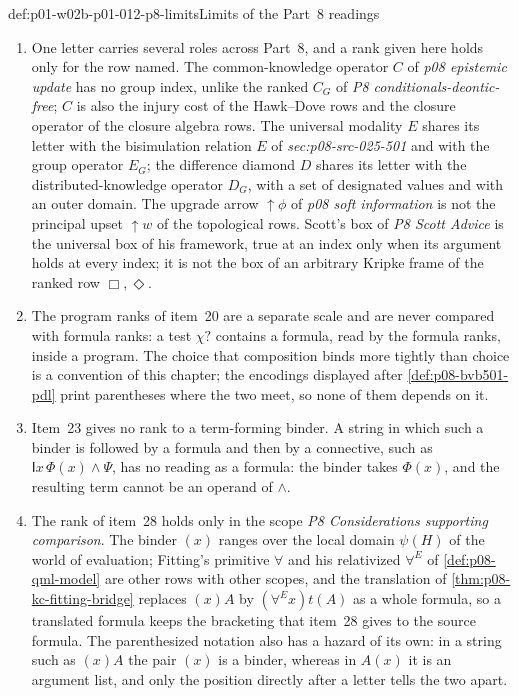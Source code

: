 \begin{hbwarning}{def:p01-w02b-p01-012-p8-limits}{Limits of the Part~8 readings}
\begin{enumerate}
  \cref{thm:p08-bvb501-mu-constructions}), or a derivation step that copies
  an expression verbatim depends on the bracketing that the convention
  selects.
\item One letter carries several roles across Part~8, and a rank given here
  holds only for the row named.  The common-knowledge operator \(C\) of
  \emph{p08 epistemic update} has no group index, unlike the ranked
  \(C_G\) of \emph{P8 conditionals-deontic-free}; \(C\) is also the injury
  cost of the Hawk--Dove rows and the closure operator of the closure
  algebra rows.  The universal modality \(E\) shares its letter with the
  bisimulation relation \(E\) of \emph{sec:p08-src-025-501} and with the
  group operator \(E_G\); the difference diamond \(D\) shares its letter
  with the distributed-knowledge operator \(D_G\), with a set of designated
  values and with an outer domain.  The upgrade arrow \({\uparrow}\phi\)
  of \emph{p08 soft information} is not the principal upset
  \({\uparrow}w\) of the topological rows.  Scott's box of
  \emph{P8 Scott Advice} is the universal box of his framework, true at an
  index only when its argument holds at every index; it is not the box of
  an arbitrary Kripke frame of the ranked row \(\Box,\Diamond\).
\item The program ranks of item~20 are a separate scale and are never
  compared with formula ranks: a test \(\chi?\) contains a formula, read by
  the formula ranks, inside a program.  The choice that composition binds
  more tightly than choice is a convention of this chapter; the encodings
  displayed after \cref{def:p08-bvb501-pdl} print parentheses where the two
  meet, so none of them depends on it.
\item Item~23 gives no rank to a term-forming binder.  A string in which
  such a binder is followed by a formula and then by a connective, such as
  \(\mathsf I x\,\Phi(x)\land\Psi\), has no reading as a formula: the
  binder takes \(\Phi(x)\), and the resulting term cannot be an operand
  of \(\land\).
\item The rank of item~28 holds only in the scope \emph{P8 Considerations
  supporting comparison}.  The binder \((x)\) ranges over the local domain
  \(\psi(H)\) of the world of evaluation; Fitting's primitive \(\forall\)
  and his relativized \(\forall^E\) of \cref{def:p08-qml-model} are other
  rows with other scopes, and the translation of
  \cref{thm:p08-kc-fitting-bridge} replaces \((x)A\) by
  \((\forall^Ex)t(A)\) as a whole formula, so a translated formula keeps
  the bracketing that item~28 gives to the source formula.  The
  parenthesized notation also has a hazard of its own: in a string such as
  \((x)A\) the pair \((x)\) is a binder, whereas in \(A(x)\) it is an
  argument list, and only the position directly after a letter tells the
  two apart.
\end{enumerate}
\end{hbwarning}

